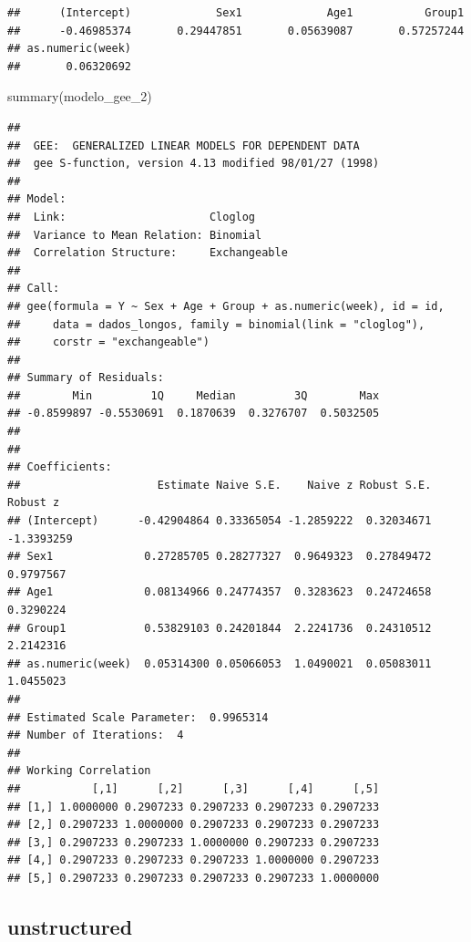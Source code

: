 \documentclass[
]{article}
\newenvironment{Shaded}{\begin{snugshade}}{\end{snugshade}}
\newcommand{\FunctionTok}[1]{\textcolor[rgb]{0.00,0.00,0.00}{#1}}
\newcommand{\NormalTok}[1]{#1}
\begin{document}
\begin{verbatim}
##      (Intercept)             Sex1             Age1           Group1 
##      -0.46985374       0.29447851       0.05639087       0.57257244 
## as.numeric(week) 
##       0.06320692
\end{verbatim}

\begin{Shaded}
\begin{Highlighting}[]
\FunctionTok{summary}\NormalTok{(modelo\_gee\_2)}
\end{Highlighting}
\end{Shaded}

\begin{verbatim}
## 
##  GEE:  GENERALIZED LINEAR MODELS FOR DEPENDENT DATA
##  gee S-function, version 4.13 modified 98/01/27 (1998) 
## 
## Model:
##  Link:                      Cloglog 
##  Variance to Mean Relation: Binomial 
##  Correlation Structure:     Exchangeable 
## 
## Call:
## gee(formula = Y ~ Sex + Age + Group + as.numeric(week), id = id, 
##     data = dados_longos, family = binomial(link = "cloglog"), 
##     corstr = "exchangeable")
## 
## Summary of Residuals:
##        Min         1Q     Median         3Q        Max 
## -0.8599897 -0.5530691  0.1870639  0.3276707  0.5032505 
## 
## 
## Coefficients:
##                     Estimate Naive S.E.    Naive z Robust S.E.   Robust z
## (Intercept)      -0.42904864 0.33365054 -1.2859222  0.32034671 -1.3393259
## Sex1              0.27285705 0.28277327  0.9649323  0.27849472  0.9797567
## Age1              0.08134966 0.24774357  0.3283623  0.24724658  0.3290224
## Group1            0.53829103 0.24201844  2.2241736  0.24310512  2.2142316
## as.numeric(week)  0.05314300 0.05066053  1.0490021  0.05083011  1.0455023
## 
## Estimated Scale Parameter:  0.9965314
## Number of Iterations:  4
## 
## Working Correlation
##           [,1]      [,2]      [,3]      [,4]      [,5]
## [1,] 1.0000000 0.2907233 0.2907233 0.2907233 0.2907233
## [2,] 0.2907233 1.0000000 0.2907233 0.2907233 0.2907233
## [3,] 0.2907233 0.2907233 1.0000000 0.2907233 0.2907233
## [4,] 0.2907233 0.2907233 0.2907233 1.0000000 0.2907233
## [5,] 0.2907233 0.2907233 0.2907233 0.2907233 1.0000000
\end{verbatim}

\hypertarget{unstructured}{%
\subsection{unstructured}\label{unstructured}}
\end{document}
